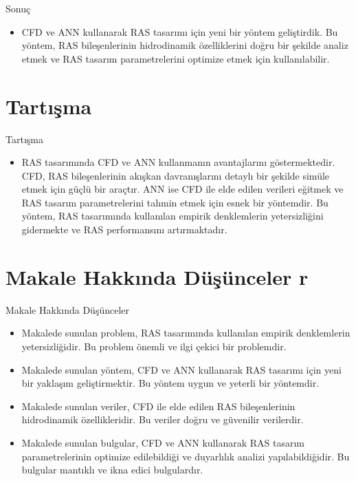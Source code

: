 \documentclass{beamer}
\begin{document}
\begin{frame}{Sonuç}
\begin{itemize}
  \item     CFD ve ANN kullanarak RAS tasarımı için yeni bir yöntem geliştirdik. Bu yöntem, RAS bileşenlerinin hidrodinamik özelliklerini doğru bir şekilde analiz etmek ve RAS tasarım parametrelerini optimize etmek için kullanılabilir. 
\end{itemize}
\end{frame}

\section{Tartışma}

\begin{frame}{Tartışma}
\begin{itemize}
  \item  RAS tasarımında CFD ve ANN kullanmanın avantajlarını göstermektedir. CFD, RAS bileşenlerinin akışkan davranışlarını detaylı bir şekilde simüle etmek için güçlü bir araçtır. ANN ise CFD ile elde edilen verileri eğitmek ve RAS tasarım parametrelerini tahmin etmek için esnek bir yöntemdir. Bu yöntem, RAS tasarımında kullanılan empirik denklemlerin yetersizliğini gidermekte ve RAS performansını artırmaktadır. 
\end{itemize}
\end{frame}

\section{Makale Hakkında Düşünceler r}

\begin{frame}{Makale Hakkında Düşünceler }

\begin{itemize}
  \item Makalede sunulan problem, RAS tasarımında kullanılan empirik denklemlerin yetersizliğidir. Bu problem önemli ve ilgi çekici bir problemdir.
  \item Makalede sunulan yöntem, CFD ve ANN kullanarak RAS tasarımı için yeni bir yaklaşım geliştirmektir. Bu yöntem uygun ve yeterli bir yöntemdir.
  \item Makalede sunulan veriler, CFD ile elde edilen RAS bileşenlerinin hidrodinamik özellikleridir. Bu veriler doğru ve güvenilir verilerdir.
  \item Makalede sunulan bulgular, CFD ve ANN kullanarak RAS tasarım parametrelerinin optimize edilebildiği ve duyarlılık analizi yapılabildiğidir. Bu bulgular mantıklı ve ikna edici bulgulardır.

\end{itemize}
\end{frame}
\end{document}
